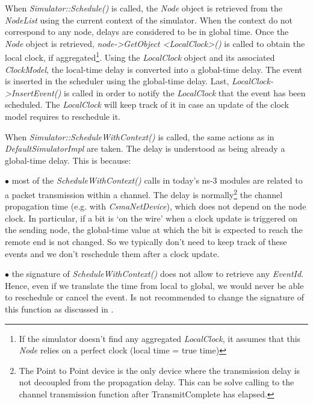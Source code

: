 \documentclass[times, twoside, watermark]{zHenriquesLab-StyleBioRxiv}
\begin{document}
When \textit{Simulator::Schedule()} is called, the \textit{Node} object is retrieved from the \textit{NodeList} using the current context of the simulator. When the context do not correspond to any node, delays are considered to be in global time.
Once the \textit{Node} object is retrieved, \textit{node->GetObject <LocalClock>()} is called to obtain the local clock, if aggregated\footnote{If the simulator doesn't find any aggregated \textit{LocalClock}, it assumes that this \textit{Node} relies on a perfect clock (local time = true time)}.
Using the \textit{LocalClock} object and its associated \textit{ClockModel}, the local-time delay is converted into a global-time delay. The event is inserted in the scheduler using the global-time delay. Last, \textit{LocalClock->InsertEvent()} is called in order to notify the \textit{LocalClock} that the event has been scheduled. The \textit{LocalClock} will keep track of it in case an update of the clock model requires to reschedule it.

When \textit{Simulator::ScheduleWithContext()} is called, the same actions as in \textit{DefaultSimulatorImpl} are taken. The delay is understood as being already a global-time delay. This is because:

$\bullet$ most of the \textit{ScheduleWithContext()} calls in today's ns-3 modules are related to a packet transmission within a channel. The delay is normally\footnote{The Point to Point device is the only device where the transmission delay is not decoupled from the propagation delay. This can be solve calling to the channel transmission function after TransmitComplete has elapsed.} the channel propagation time (e.g. with \textit{CsmaNetDevice}), which does not depend on the node clock. In particular, if a bit is `on the wire' when a clock update is triggered on the sending node, the global-time value at which the bit is expected to reach the remote end is not changed. So we typically don't need to keep track of these events and we don't reschedule them after a clock update.  

$\bullet$ the signature of \textit{ScheduleWithContext()} does not allow to retrieve any \textit{EventId}. Hence, even if we translate the time from local to global, we would never be able to reschedule or cancel the event. Is not recommended to change the signature of this function as discussed in \cite{ScheduleDiscuss}.
\end{document}
